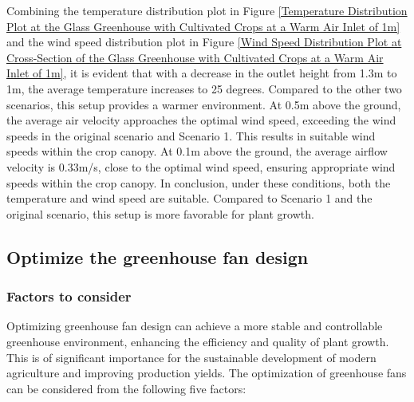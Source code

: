 \documentclass{apmcmthesis}
\begin{document}
{Combining the temperature distribution plot in Figure \ref{Temperature Distribution Plot at the Glass Greenhouse with Cultivated Crops at a Warm Air Inlet of 1m} and the wind speed distribution plot in Figure \ref{Wind Speed Distribution Plot at Cross-Section of the Glass Greenhouse with Cultivated Crops at a Warm Air Inlet of 1m}, it is evident that with a decrease in the outlet height from 1.3m to 1m, the average temperature increases to 25 degrees. Compared to the other two scenarios, this setup provides a warmer environment. At 0.5m above the ground, the average air velocity approaches the optimal wind speed, exceeding the wind speeds in the original scenario and Scenario 1. This results in suitable wind speeds within the crop canopy. At 0.1m above the ground, the average airflow velocity is 0.33m/s, close to the optimal wind speed, ensuring appropriate wind speeds within the crop canopy. In conclusion, under these conditions, both the temperature and wind speed are suitable. Compared to Scenario 1 and the original scenario, this setup is more favorable for plant growth.



\subsection{Optimize the greenhouse fan design}

\subsubsection{Factors to consider}

Optimizing greenhouse fan design can achieve a more stable and controllable greenhouse environment, enhancing the efficiency and quality of plant growth. This is of significant importance for the sustainable development of modern agriculture and improving production yields. The optimization of greenhouse fans can be considered from the following five factors:

}
\end{document}
